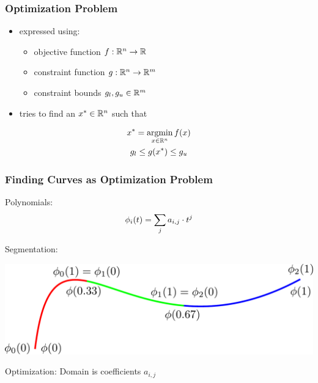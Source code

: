 \documentclass[mathserif]{beamer}
\begin{document}
		\begin{frame}
			\frametitle{Optimization Problem}
			\begin{itemize}
				\item expressed using:
				\begin{itemize}
					\item objective function \(f : \mathbb{R}^{n} \rightarrow \mathbb{R}\)
					\item constraint function \(g : \mathbb{R}^{n} \rightarrow \mathbb{R}^{m}\)
					\item constraint bounds \(g_l, g_u \in \mathbb{R}^{m}\)
				\end{itemize} 
				\item tries to find an \(x^* \in \mathbb{R}^{n}\) such that 
			\end{itemize}
			\begin{equation*}
				\begin{gathered}
					x^* = \operatorname*{argmin}_{x \in \mathbb{R}^{n}} f\!\left( x \right)\\
					g_l \leq g\!\left( x^* \right) \leq g_u
				\end{gathered}
			\end{equation*}
		\end{frame}
		
		
		\begin{frame}
			\frametitle{Finding Curves as Optimization Problem}

			Polynomials:
			\begin{equation*}
				\phi_i\!\left( t \right) = \sum_j a_{i,j} \cdot t^j
			\end{equation*}

			Segmentation:
			\begin{centering}
				\includegraphics[width=\textwidth]{../resources/segmentation.pdf}
			\end{centering}

			\vspace{5mm}

			Optimization: Domain is coefficients \(a_{i,j}\)
		\end{frame}
\end{document}
